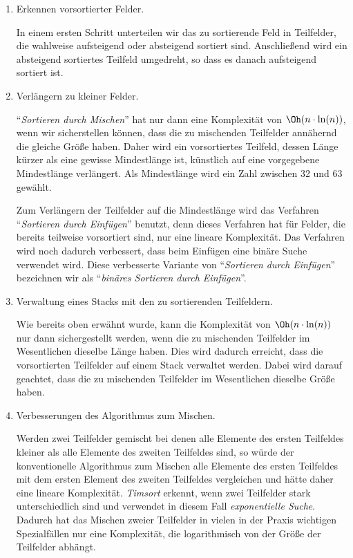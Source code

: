 \begin{enumerate}
\item Erkennen vorsortierter Felder.

      In einem ersten Schritt unterteilen wir das zu sortierende Feld in Teilfelder, 
      die wahlweise aufsteigend oder absteigend sortiert sind.  Anschlie{\ss}end wird ein absteigend
      sortiertes Teilfeld umgedreht, so dass es danach aufsteigend sortiert ist.
\item Verl\"angern zu kleiner Felder.

      ``\emph{Sortieren durch Mischen}'' hat nur dann eine Komplexit\"at von $\Oh(n \cdot \ln(n))$, wenn
      wir sicherstellen k\"onnen, dass die zu mischenden Teilfelder ann\"ahernd die gleiche Gr\"o{\ss}e haben.
      Daher wird ein vorsortiertes Teilfeld, dessen L\"ange k\"urzer als eine gewisse Mindestl\"ange 
      ist, k\"unstlich auf eine vorgegebene Mindestl\"ange verl\"angert.  Als Mindestl\"ange wird ein Zahl zwischen
      32 und 63 gew\"ahlt. 

      Zum Verl\"angern der Teilfelder auf die Mindestl\"ange wird das Verfahren 
      ``\emph{Sortieren durch Einf\"ugen}'' benutzt, denn dieses Verfahren hat f\"ur Felder, die bereits
      teilweise vorsortiert sind, nur eine lineare Komplexit\"at.  Das Verfahren wird noch dadurch
      verbessert, dass beim Einf\"ugen eine bin\"are Suche verwendet wird.  Diese verbesserte Variante
      von ``\emph{Sortieren durch Einf\"ugen}'' bezeichnen wir als 
      ``\emph{bin\"ares Sortieren durch Einf\"ugen}''.
\item Verwaltung eines Stacks mit den zu sortierenden Teilfeldern.

      Wie bereits oben erw\"ahnt wurde, kann die Komplexit\"at von $\Oh(n \cdot \ln(n))$ nur dann
      sichergestellt werden, wenn die zu mischenden Teilfelder im Wesentlichen dieselbe L\"ange
      haben.  Dies wird dadurch erreicht, dass die vorsortierten Teilfelder auf einem Stack
      verwaltet werden.  Dabei wird darauf geachtet, dass die zu mischenden Teilfelder im
      Wesentlichen dieselbe Gr\"o{\ss}e haben.
\item Verbesserungen des Algorithmus zum Mischen.

      Werden zwei Teilfelder gemischt bei denen alle Elemente des ersten Teilfeldes kleiner als alle
      Elemente des zweiten Teilfeldes sind, so w\"urde der konventionelle Algorithmus zum Mischen
      alle Elemente des ersten Teilfeldes mit dem ersten Element des zweiten Teilfeldes vergleichen
      und h\"atte daher eine lineare Komplexit\"at.  \emph{Timsort} erkennt, wenn zwei Teilfelder stark
      unterschiedlich sind und verwendet in diesem Fall \emph{exponentielle Suche}.  Dadurch hat 
      das Mischen zweier Teilfelder in vielen in der Praxis wichtigen Spezialf\"allen nur eine
      Komplexit\"at, die logarithmisch von der Gr\"o{\ss}e der Teilfelder abh\"angt.
\end{enumerate}
